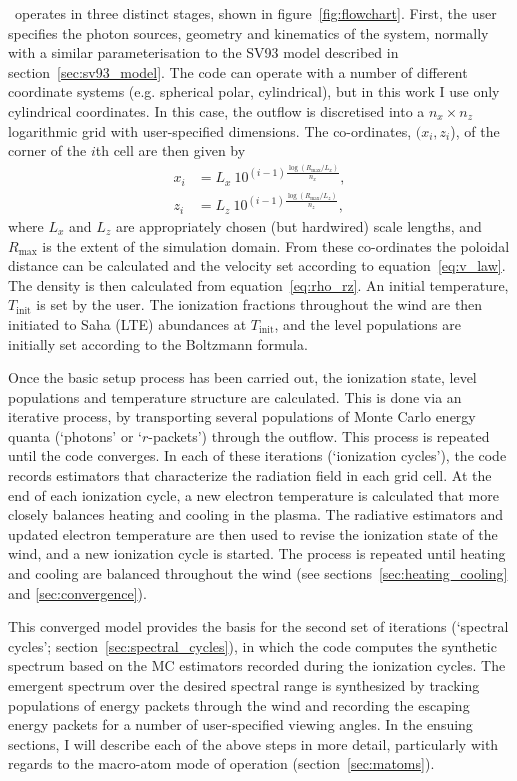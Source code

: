 \py\ operates in three distinct stages, shown in figure~\ref{fig:flowchart}. 
First, the user specifies the photon sources,
geometry and kinematics of the system, normally with a similar parameterisation
to the SV93 model described in section~\ref{sec:sv93_model}. 
The code can operate with a number of different coordinate systems 
(e.g. spherical polar, cylindrical), but in this work I use only cylindrical coordinates.
In this case, the outflow is discretised into a $n_x \times n_z$ logarithmic grid with 
user-specified dimensions. The co-ordinates, $(x_i, z_i$), 
of the corner of the $i$th cell are then given by
\begin{align}
x_i &= L_{x}~10^{(i-1)\frac{\log (R_{\mathrm{max}} / L_{x})}{n_x}},\\
z_i &= L_{z}~10^{(i-1)\frac{\log (R_{\mathrm{max}} / L_{z})}{n_z}},
\end{align}
where $L_x$ and $L_z$ are appropriately chosen (but hardwired) scale lengths, and $R_{\mathrm{max}}$ 
is the extent of the simulation domain.
From these co-ordinates the poloidal distance can be calculated and
the velocity set according to equation~\ref{eq:v_law}. The density
is then calculated from equation~\ref{eq:rho_rz}. An initial temperature,
$T_{\mathrm{init}}$ is set by the user. The ionization fractions throughout
the wind are then initiated to Saha (LTE) abundances at $T_{\mathrm{init}}$, and the level 
populations are initially set according to the Boltzmann formula.

Once the basic setup process has been carried out, the ionization state,
level populations and temperature structure are calculated.
This is done via an iterative process, by transporting several populations of 
Monte Carlo energy quanta (`photons' or `$r$-packets') through the outflow.
This process is repeated until the code converges. 
In each of these iterations (`ionization cycles'), the code records estimators that 
characterize the radiation field in each grid cell. At the end 
of each ionization cycle, a new electron temperature is calculated
that more closely balances heating and cooling in the 
plasma. The radiative estimators and updated electron
temperature are then used to revise the ionization state of the wind,
and a new ionization cycle is started. The process is repeated until
heating and cooling are balanced throughout the wind (see sections~\ref{sec:heating_cooling}
and \ref{sec:convergence}). 

This converged model provides the basis for the second set of
iterations (`spectral cycles'; section~\ref{sec:spectral_cycles}), 
in which the code computes the synthetic spectrum based on the 
MC estimators recorded during the ionization cycles. 
The emergent spectrum over the desired spectral range is synthesized by 
tracking populations of energy packets through the wind and recording 
the escaping energy packets for
a number of user-specified viewing angles.  In the ensuing sections,
I will describe each of the above steps in more detail, particularly
with regards to the macro-atom mode of operation (section~\ref{sec:matoms}).



